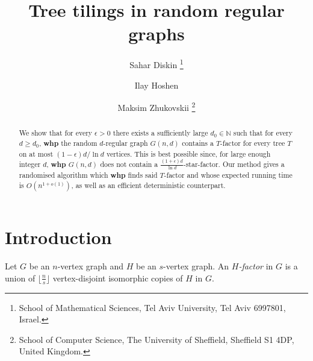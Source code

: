 \documentclass[notitlepage]{scrartcl}
\newcommand{\footremember}[2]{\footnote{#2}
    \newcounter{#1}
    \setcounter{#1}{\value{footnote}}}
\newcommand{\footrecall}[1]{\footnotemark[\value{#1}]}
\begin{document}
\title{\vspace{-2em}Tree tilings in random regular graphs}
\author{Sahar Diskin \footremember{alley}{School of Mathematical Sciences, Tel Aviv University, Tel Aviv 6997801, Israel.}\and Ilay Hoshen \footrecall{alley}\and Maksim Zhukovskii \footremember{alley2}{School of Computer Science, The University of Sheffield, Sheffield S1 4DP, United Kingdom.}
}


\date{}
\maketitle
\begin{abstract}
We show that for every $\epsilon>0$ there exists a sufficiently large $d_0\in \mathbb{N}$ such that for every $d\ge d_0$, \textbf{whp} the random $d$-regular graph $G(n,d)$ contains a $T$-factor for every tree $T$ on at most $(1-\epsilon)d/\ln d$ vertices. This is best possible since, for large enough integer $d$, \textbf{whp} $G(n,d)$ does not contain a $\frac{(1+\epsilon)d}{\ln d}$-star-factor. Our method gives a randomised algorithm which \textbf{whp} finds said $T$-factor and whose expected running time is $O(n^{1+o(1)})$, as well as an efficient deterministic counterpart.
\end{abstract}


\section{Introduction}
Let $G$ be an $n$-vertex graph and $H$ be an $s$-vertex graph. An \textit{$H$-factor} in $G$ is a union of $\lfloor\frac{n}{s}\rfloor$ vertex-disjoint isomorphic copies of $H$ in $G$. 
\end{document}
